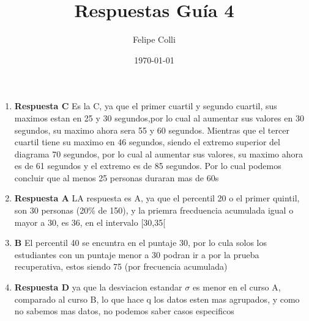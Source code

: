 \documentclass[11pt]{article}
\title{Respuestas Guía 4}
\author{Felipe Colli}
\date{\today}
\begin{document}
\maketitle

\begin{enumerate}
\section{Respuestas 01-20} 


\section{Respuestas 21-40}


\section{Respuestas 41-60}


\section{Respuestas 61-80}


\section{Respuestas 81-100}

    \item \textbf{Respuesta C} Es la C, ya que el primer cuartil y segundo cuartil, sus maximos estan en 25 y 30 segundos,por lo cual al aumentar sus valores en 30 segundos, su maximo ahora sera 55 y 60 segundos. Mientras que el tercer cuartil tiene su maximo en 46 segundos, siendo el extremo superior del diagrama 70 segundos, por lo cual al aumentar sus valores, su maximo ahora es de 61 segundos y el extremo es de 85 segundos. Por lo cual podemos concluir que al menos 25 personas duraran mas de 60s %
    \item \textbf{Respuesta A} LA respuesta es A, ya que el percentil 20 o el primer quintil, son 30 personas (20\% de 150), y la priemra frecduencia acumulada igual o mayor a 30, es 36, en el intervalo [30,35[ %
    \item \textbf{B} El percentil 40 se encuntra en el puntaje 30, por lo cula solos los estudiantes con un puntaje menor a 30 podran ir a por la prueba recuperativa, estos siendo 75 (por frecuencia acumulada) %

    \item \textbf{Respuesta D} ya que la desviacion estandar $\sigma$ es menor en el curso A, comparado al curso B, lo que hace q los datos esten mas agrupados, y como no sabemos mas datos, no podemos saber casos especificos  %


\end{enumerate}
\end{document}
